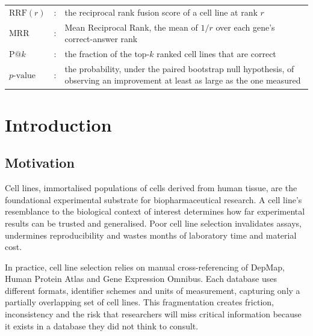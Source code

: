 \documentclass[author={Karen Coutinho, Ishaan Bhalla, Aman Raj, Dixit Kaloorani Malarmannan},
                supervisor={Dr. Daniel D'Andrea},
                degree={MSc},
                title={CellSelector Omics: A Multi-Omics Recommendation System for Cell Line Selection},
                subtitle={},
                type={},
                year={2026}]{dissertation}
\begin{document}
{\vspace{0.4cm}

\begin{tabular}{@{}p{2.6cm}cp{11.2cm}@{}}

$\mathrm{RRF}(r)$       & : & the reciprocal rank fusion score of a cell line at rank $r$ \\
$\mathrm{MRR}$          & : & Mean Reciprocal Rank, the mean of $1/r$ over each gene's correct-answer rank \\
$\mathrm{P@}k$          & : & the fraction of the top-$k$ ranked cell lines that are correct \\
$p\text{-value}$        & : & the probability, under the paired bootstrap null hypothesis, of observing an improvement at least as large as the one measured \\
\end{tabular}
}


\mainmatter


\chapter{Introduction}
\label{chap:introduction}

\section{Motivation}

Cell lines, immortalised populations of cells derived from human tissue, are the foundational experimental substrate for biopharmaceutical research. A cell line's resemblance to the biological context of interest determines how far experimental results can be trusted and generalised. Poor cell line selection invalidates assays, undermines reproducibility and wastes months of laboratory time and material cost.

In practice, cell line selection relies on manual cross-referencing of DepMap, Human Protein Atlas and Gene Expression Omnibus. Each database uses different formats, identifier schemes and units of measurement, capturing only a partially overlapping set of cell lines. This fragmentation creates friction, inconsistency and the risk that researchers will miss critical information because it exists in a database they did not think to consult.
\end{document}
